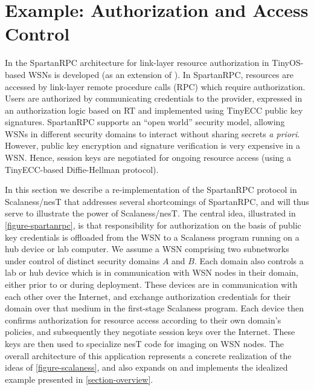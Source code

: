 \section{Example: Authorization and Access Control}
\label{section-application}

In \cite{chapin-skalka-SpartanRPCTR} the SpartanRPC architecture for link-layer resource
authorization in TinyOS-based WSNs is developed (as an extension of
\cite{chapin-skalka-SpartanRPC}). In SpartanRPC, resources are accessed by link-layer remote
procedure calls (RPC) which require authorization. Users are authorized by communicating
credentials to the provider, expressed in an authorization logic based on RT \cite{Li:RRBTMF}
and implemented using TinyECC \cite{Liu-Peng-TinyECC-2008} public key signatures. SpartanRPC
supports an ``open world'' security model, allowing WSNs in different security domains to
interact without sharing secrets \emph{a priori}. However, public key encryption and signature
verification is very expensive in a WSN. Hence, session keys are negotiated for ongoing resource
access (using a TinyECC-based Diffie-Hellman protocol).

In this section we describe a re-implementation of the SpartanRPC protocol in Scalaness/nesT
that addresses several shortcomings of SpartanRPC, and will thus serve to illustrate the power
of Scalaness/nesT. The central idea, illustrated in \autoref{figure-spartanrpc}, is that
responsibility for authorization on the basis of public key credentials is offloaded from the
WSN to a Scalaness program running on a hub device or lab computer. We assume a WSN comprising
two subnetworks under control of distinct security domains $A$ and $B$. Each domain also
controls a lab or hub device which is in communication with WSN nodes in their domain, either
prior to or during deployment. These devices are in communication with each other over the
Internet, and exchange authorization credentials for their domain over that medium in the
first-stage Scalaness program. Each device then confirms authorization for resource access
according to their own domain's policies, and subsequently they negotiate session keys over the
Internet. These keys are then used to specialize nesT code for imaging on WSN nodes. The overall
architecture of this application represents a concrete realization of the ideas of
\autoref{figure-scalaness}, and also expands on and implements the idealized example presented
in \autoref{section-overview}.%


